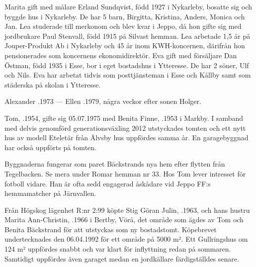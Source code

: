Marita gift med målare Erland Sundqvist, född 1927 i Nykarleby, bosatte sig och byggde hus i Nykarleby. De har 5 barn, Birgitta, Kristina, Anders, Monica och Jan. Lea studerade till merkonom och blev kvar i Jeppo, då hon gifte sig med jordbrukare Paul Stenvall, född 1915 på Silvast hemman. Lea arbetade 1,5 år på Jouper-Produkt Ab i Nykarleby och 45 år inom KWH-koncernen, därifrån hon pensionerades som koncernens ekonomidirektör. Eva gift med försäljare Dan Östman, född 1935 i Esse, bor i eget bostadshus i Ytteresse. De har 2 söner, Ulf och Nils. Eva har arbetat tidvis som posttjänsteman i Esse och Kållby samt som städerska på skolan i Ytteresse.

Alexander .1973  ---   Ellen .1979, några veckor efter sonen Holger.



%



%
Tom, .1954, gifte sig 05.07.1975 med Benita Finne, .1953 i Markby. I samband med delvis genomförd generationsväxling 2012 utstyckades tomten och ett nytt hus av modell Eteletär från Älvsby hus uppfördes samma år. En garagebyggnad har också uppförts på tomten.

Byggnaderna fungerar som paret Bäckstrands nya hem efter flytten från Tegelbacken. Se mera under Romar hemman nr 33. Hos Tom lever intresset för fotboll vidare. Han är ofta sedd engagerad åskådare vid Jeppo FF:s hemmamatcher på Järnvallen.


%


%
Från Högskog lägenhet R:nr 2:99 köpte Stig Göran Julin, .1963, och hans hustru Marita Ann-Christin, .1966 i Bertby, Vörå, det område som ägdes av Tom och Benita Bäckstrand för att utstyckas som ny bostadstomt. Köpebrevet undertecknades den 06.04.1992 för ett område på 5000 m². Ett Gullringshus om 124 m² uppfördes snabbt och var klart för inflyttning redan på sommaren. Samtidigt uppfördes även garaget medan en jordkällare färdigställdes senare.

